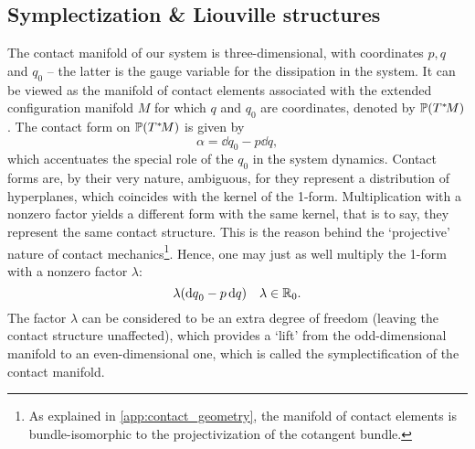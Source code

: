\subsection{Symplectization \& Liouville structures}
The contact manifold of our system is three-dimensional, with coordinates $p, q$ and $q_0$ -- the latter is the gauge variable for the dissipation in the system. It can be viewed as the manifold of contact elements associated with the extended configuration manifold $M$ for which $q$ and $q_0$ are coordinates, denoted by $\mathbb{P}\qty(T^*\!M)$. The contact form on $\mathbb{P}\qty(T^*\!M)$ is given by 
\begin{equation}
    \alpha = \dd{q}_0 - p\dd{q},
    \label{eq:dho_contact_form}
\end{equation}
which accentuates the special role of the $q_0$ in the system dynamics. Contact forms are, by their very nature, ambiguous, for they represent a distribution of hyperplanes, which coincides with the kernel of the 1-form. Multiplication with a nonzero factor yields a different form with the same kernel, that is to say, they represent the same contact structure. This is the reason behind the `projective' nature of contact mechanics\footnote{As explained in \cref{app:contact_geometry}, the manifold of contact elements is bundle-isomorphic to the projectivization of the cotangent bundle.}. Hence, one may just as well multiply the 1-form with a nonzero factor $\lambda$:
$$ \lambda\qty(\dd{q}_0 - p\dd{q}) \quad \lambda \in \mathbb{R}_0. $$
The factor $\lambda$ can be considered to be an extra degree of freedom (leaving the contact structure unaffected), which provides a `lift' from the odd-dimensional manifold to an even-dimensional one, which is called the symplectification of the contact manifold. \cite{Arnold1989}

